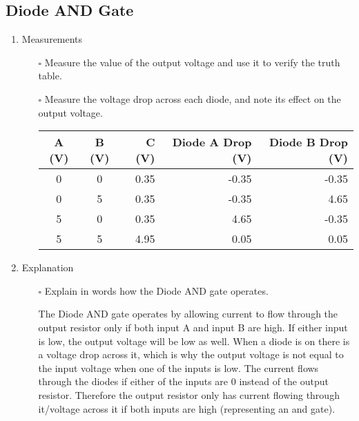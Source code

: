 \documentclass[12pt]{article}
\begin{document}
\subsection{Diode AND Gate}


\begin{enumerate}
\item Measurements
\begin{itemize}
    \item[$\square$] Measure the value of the output voltage and use it to verify the truth table.


    
    \item[$\square$] Measure the voltage drop across each diode, and note its effect on the output voltage.

\begin{tabular}{|c|c|r|r|r|}
\hline
A (V) & B (V) & C (V)& Diode A Drop (V)& Diode B Drop (V)\\
\hline
0 & 0 & 0.35 & -0.35 & -0.35\\
0 & 5 & 0.35 & -0.35 & 4.65 \\
5 & 0 & 0.35 & 4.65 & -0.35 \\
5 & 5 & 4.95 & 0.05 & 0.05 \\
\hline
\end{tabular}

    
\end{itemize}
\item Explanation
\begin{itemize}
    \item[$\square$] Explain in words how the Diode AND gate operates.

    The Diode AND gate operates by allowing current to flow through the output resistor only if both input A and input B are high.
    If either input is low, the output voltage will be low as well.
    When a diode is on there is a voltage drop across it, which is why the output voltage is not equal to the input voltage when one of the inputs is low.
    The current flows through the diodes if either of the inputs are 0 instead of the output resistor.
    Therefore the output resistor only has current flowing through it/voltage across it if both inputs are high (representing an and gate).

    
\end{itemize}
\end{enumerate}

\clearpage
\end{document}
